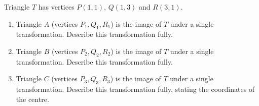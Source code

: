 \begin{question}
\begin{center}
\end{center}

\noindent Triangle $T$ has vertices $P(1,1)$, $Q(1,3)$ and $R(3,1)$.

\begin{enumerate}
    \item[(a)] Triangle $A$ (vertices $P_1, Q_1, R_1$) is the image of $T$ under a single transformation. Describe this transformation fully.

    \vspace{3cm}

    \item[(b)] Triangle $B$ (vertices $P_2, Q_2, R_2$) is the image of $T$ under a single transformation. Describe this transformation fully.

    \vspace{3cm}

    \item[(c)] Triangle $C$ (vertices $P_3, Q_3, R_3$) is the image of $T$ under a single transformation. Describe this transformation fully, stating the coordinates of the centre.

    \vspace{3cm}
\end{enumerate}
\end{question}
